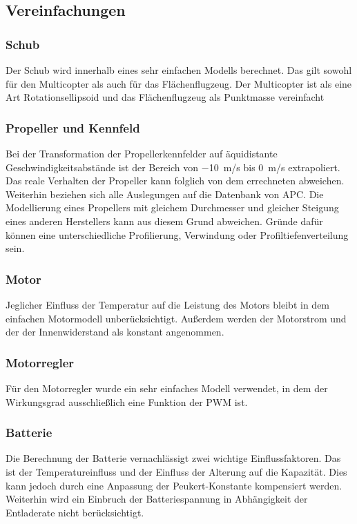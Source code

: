 \subsection{Vereinfachungen}
\subsubsection{Schub}
Der Schub wird innerhalb eines sehr einfachen Modells berechnet. Das gilt sowohl für den Multicopter als auch für das Flächenflugzeug. Der Multicopter ist als eine Art Rotationsellipsoid und das Flächenflugzeug als Punktmasse vereinfacht

\subsubsection{Propeller und Kennfeld}
Bei der Transformation der Propellerkennfelder auf äquidistante Geschwindigkeitsabstände ist der Bereich von \SI{-10}{m/s} bis \SI{0}{m/s} extrapoliert. Das reale Verhalten der Propeller kann folglich von dem errechneten abweichen. Weiterhin beziehen sich alle Auslegungen auf die Datenbank von APC. 
Die Modellierung eines Propellers mit gleichem Durchmesser und gleicher Steigung eines anderen Herstellers kann aus diesem Grund abweichen. Gründe dafür können eine unterschiedliche Profilierung, Verwindung oder Profiltiefenverteilung sein. 

\subsubsection{Motor}
Jeglicher Einfluss der Temperatur auf die Leistung des Motors bleibt in dem einfachen Motormodell unberücksichtigt. Außerdem werden der Motorstrom und der der Innenwiderstand als konstant angenommen.

\subsubsection{Motorregler}
Für den Motorregler wurde ein sehr einfaches Modell verwendet, in dem der Wirkungsgrad ausschließlich eine Funktion der PWM ist.

\subsubsection{Batterie}
Die Berechnung der Batterie vernachlässigt zwei wichtige Einflussfaktoren. Das ist der Temperatureinfluss und der Einfluss der Alterung auf die Kapazität. Dies kann jedoch durch eine Anpassung der Peukert-Konstante kompensiert werden. Weiterhin wird ein Einbruch der Batteriespannung in Abhängigkeit der Entladerate nicht berücksichtigt.

